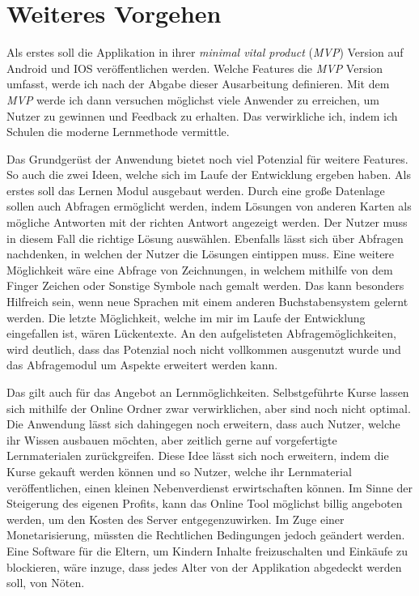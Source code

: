\section{Weiteres Vorgehen}
Als erstes soll die Applikation in ihrer \textit{minimal vital product} (\textit{MVP}) Version auf Android und IOS veröffentlichen werden. Welche Features die \textit{MVP} Version umfasst, werde ich nach der Abgabe dieser Ausarbeitung definieren. Mit dem \textit{MVP} werde ich dann versuchen möglichst viele Anwender zu erreichen, um Nutzer zu gewinnen und Feedback zu erhalten. Das verwirkliche ich, indem ich Schulen die moderne Lernmethode vermittle.

Das Grundgerüst der Anwendung bietet noch viel Potenzial für weitere Features. So auch die zwei Ideen, welche sich im Laufe der Entwicklung ergeben haben. Als erstes soll das Lernen Modul ausgebaut werden. Durch eine große Datenlage sollen auch Abfragen ermöglicht werden, indem Lösungen von anderen Karten als mögliche Antworten mit der richten Antwort angezeigt werden. Der Nutzer muss in diesem Fall die richtige Lösung auswählen. Ebenfalls lässt sich über Abfragen nachdenken, in welchen der Nutzer die Lösungen eintippen muss. Eine weitere Möglichkeit wäre eine Abfrage von Zeichnungen, in welchem mithilfe von dem Finger Zeichen oder Sonstige Symbole nach gemalt werden. Das kann besonders Hilfreich sein, wenn neue Sprachen mit einem anderen Buchstabensystem gelernt werden. Die letzte Möglichkeit, welche im mir im Laufe der Entwicklung eingefallen ist, wären Lückentexte. An den aufgelisteten Abfragemöglichkeiten, wird deutlich, dass das Potenzial noch nicht vollkommen ausgenutzt wurde und das Abfragemodul um Aspekte erweitert werden kann.

Das gilt auch für das Angebot an Lernmöglichkeiten. Selbstgeführte Kurse lassen sich mithilfe der Online Ordner zwar verwirklichen, aber sind noch nicht optimal. Die Anwendung lässt sich dahingegen noch erweitern, dass auch Nutzer, welche ihr Wissen ausbauen möchten, aber zeitlich gerne auf vorgefertigte Lernmaterialen zurückgreifen. Diese Idee lässt sich noch erweitern, indem die Kurse gekauft werden können und so Nutzer, welche ihr Lernmaterial veröffentlichen, einen kleinen Nebenverdienst erwirtschaften können. Im Sinne der Steigerung des eigenen Profits, kann das Online Tool möglichst billig angeboten werden, um den Kosten des Server entgegenzuwirken. Im Zuge einer Monetarisierung, müssten die Rechtlichen Bedingungen jedoch geändert werden. Eine Software für die Eltern, um Kindern Inhalte freizuschalten und Einkäufe zu blockieren, wäre inzuge, dass jedes Alter von der Applikation abgedeckt werden soll, von Nöten.
